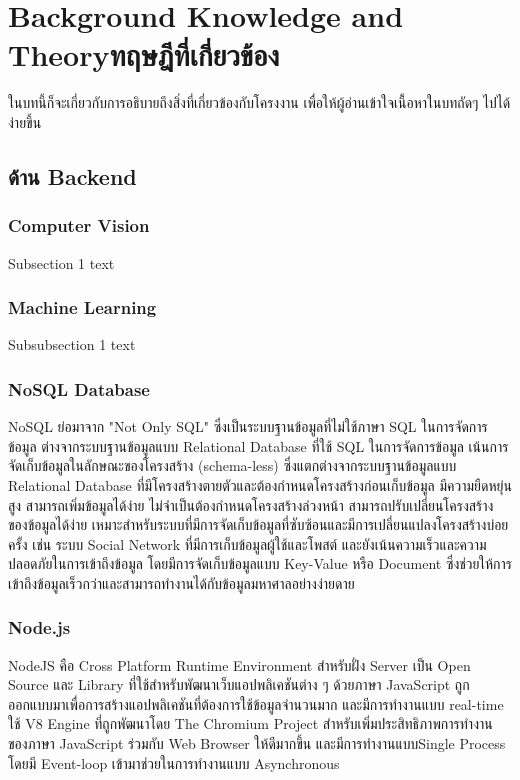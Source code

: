 \chapter{\ifenglish Background Knowledge and Theory\else ทฤษฎีที่เกี่ยวข้อง\fi}

ในบทนี้ก็จะเกี่ยวกับการอธิบายถึงสิ่งที่เกี่ยวข้องกับโครงงาน เพื่อให้ผู้อ่านเข้าใจเนื้อหาในบทถัดๆ ไปได้ง่ายขึ้น

\section{ด้าน Backend}

\subsection{Computer Vision}

Subsection 1 text

\subsection{Machine Learning}
Subsubsection 1 text

\subsection{NoSQL Database}
NoSQL ย่อมาจาก "Not Only SQL" ซึ่งเป็นระบบฐานข้อมูลที่ไม่ใช้ภาษา SQL ในการจัดการข้อมูล ต่างจากระบบฐานข้อมูลแบบ Relational Database ที่ใช้ SQL ในการจัดการข้อมูล
เน้นการจัดเก็บข้อมูลในลักษณะของโครงสร้าง (schema-less) ซึ่งแตกต่างจากระบบฐานข้อมูลแบบ Relational Database ที่มีโครงสร้างตายตัวและต้องกำหนดโครงสร้างก่อนเก็บข้อมูล
มีความยืดหยุ่นสูง สามารถเพิ่มข้อมูลได้ง่าย ไม่จำเป็นต้องกำหนดโครงสร้างล่วงหน้า สามารถปรับเปลี่ยนโครงสร้างของข้อมูลได้ง่าย เหมาะสำหรับระบบที่มีการจัดเก็บข้อมูลที่ซับซ้อนและมีการเปลี่ยนแปลงโครงสร้างบ่อยครั้ง เช่น ระบบ Social Network ที่มีการเก็บข้อมูลผู้ใช้และโพสต์
และยังเน้นความเร็วและความปลอดภัยในการเข้าถึงข้อมูล โดยมีการจัดเก็บข้อมูลแบบ Key-Value หรือ Document ซึ่งช่วยให้การเข้าถึงข้อมูลเร็วกว่าและสามารถทำงานได้กับข้อมูลมหาศาลอย่างง่ายดาย\cite{NoSQL}

\subsection{Node.js}
NodeJS คือ Cross Platform Runtime Environment สำหรับฝั่ง Server เป็น Open Source และ Library 
ที่ใช้สำหรับพัฒนาเว็บแอปพลิเคชันต่าง ๆ ด้วยภาษา JavaScript  ถูกออกแบบมาเพื่อการสร้างแอปพลิเคชันที่ต้องการใช้ข้อมูลจำนวนมาก 
และมีการทำงานแบบ real-time ใช้ V8 Engine ที่ถูกพัฒนาโดย The Chromium Project สำหรับเพิ่มประสิทธิภาพการทำงานของภาษา JavaScript 
ร่วมกับ Web Browser ให้ดีมากขึ้น และมีการทำงานแบบSingle Process โดยมี Event-loop เข้ามาช่วยในการทำงานแบบ Asynchronous\cite{Node.js}

